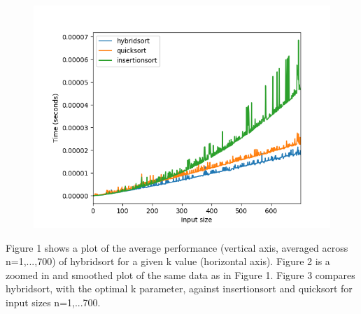 \documentclass[12pt]{article}
\theoremstyle{definition}
\newenvironment{question}[1]
  {\renewcommand\theinnercustomthm{#1}\innercustomthm}
  {\endinnercustomthm}
\begin{document}
\begin{question}{Results}
\begin{figure}[h]
  \centering
  \includegraphics[width=\textwidth]{Figure3.png}
  \caption{}
  \label{fig:boat3}
\end{figure}

Figure 1 shows a plot of the average performance (vertical axis, averaged across n=1,...,700) of hybridsort for a given k value (horizontal axis).
\newpage
Figure 2 is a zoomed in and smoothed plot of the same data as in Figure 1.
\newpage
Figure 3 compares hybridsort, with the optimal k parameter, against insertionsort and quicksort for input sizes n=1,...700.

\end{question}
\end{document}
